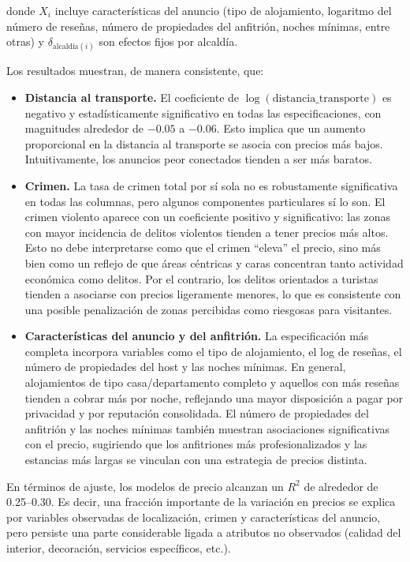 \documentclass[12pt]{article}
\begin{document}
donde \(X_i\) incluye características del anuncio (tipo de alojamiento, logaritmo del número de reseñas, número de propiedades del anfitrión, noches mínimas, entre otras) y \(\delta_{\text{alcaldía}(i)}\) son efectos fijos por alcaldía.

Los resultados muestran, de manera consistente, que:

\begin{itemize}
  \item \textbf{Distancia al transporte.} El coeficiente de \(\log(\text{distancia\_transporte})\) es negativo y estadísticamente significativo en todas las especificaciones, con magnitudes alrededor de \(-0.05\) a \(-0.06\). Esto implica que un aumento proporcional en la distancia al transporte se asocia con precios más bajos. Intuitivamente, los anuncios peor conectados tienden a ser más baratos.
  \item \textbf{Crimen.} La tasa de crimen total por sí sola no es robustamente significativa en todas las columnas, pero algunos componentes particulares sí lo son. El crimen violento aparece con un coeficiente positivo y significativo: las zonas con mayor incidencia de delitos violentos tienden a tener precios más altos. Esto no debe interpretarse como que el crimen “eleva” el precio, sino más bien como un reflejo de que áreas céntricas y caras concentran tanto actividad económica como delitos. Por el contrario, los delitos orientados a turistas tienden a asociarse con precios ligeramente menores, lo que es consistente con una posible penalización de zonas percibidas como riesgosas para visitantes.
  \item \textbf{Características del anuncio y del anfitrión.} La especificación más completa incorpora variables como el tipo de alojamiento, el log de reseñas, el número de propiedades del host y las noches mínimas. En general, alojamientos de tipo casa/departamento completo y aquellos con más reseñas tienden a cobrar más por noche, reflejando una mayor disposición a pagar por privacidad y por reputación consolidada. El número de propiedades del anfitrión y las noches mínimas también muestran asociaciones significativas con el precio, sugiriendo que los anfitriones más profesionalizados y las estancias más largas se vinculan con una estrategia de precios distinta.
\end{itemize}

En términos de ajuste, los modelos de precio alcanzan un \(R^2\) de alrededor de 0.25--0.30. Es decir, una fracción importante de la variación en precios se explica por variables observadas de localización, crimen y características del anuncio, pero persiste una parte considerable ligada a atributos no observados (calidad del interior, decoración, servicios específicos, etc.).
\end{document}

